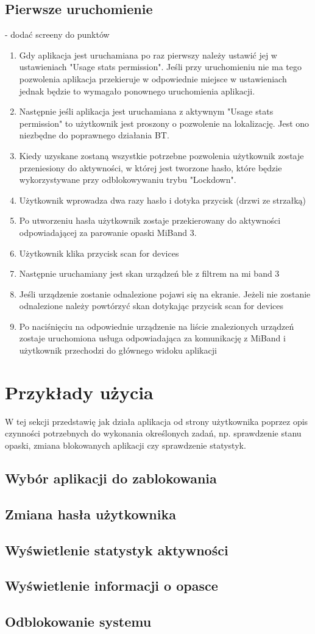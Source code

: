 \subsection{Pierwsze uruchomienie}
- dodać screeny do punktów
\begin{enumerate}
    \item Gdy aplikacja jest uruchamiana po raz pierwszy należy ustawić jej w ustawieniach "Usage stats permission". Jeśli przy uruchomieniu nie ma tego pozwolenia aplikacja przekieruje w odpowiednie miejsce w ustawieniach jednak będzie to wymagało ponownego uruchomienia aplikacji.
    \item Następnie jeśli aplikacja jest uruchamiana z aktywnym "Usage stats permission" to użytkownik jest proszony o pozwolenie na lokalizację. Jest ono niezbędne do poprawnego działania BT.
    \item Kiedy uzyskane zostaną wszystkie potrzebne pozwolenia użytkownik zostaje przeniesiony do aktywności, w której jest tworzone hasło, które będzie wykorzystywane przy odblokowywaniu trybu "Lockdown".
    \item  Użytkownik wprowadza dwa razy hasło i dotyka przycisk (drzwi ze strzałką)
    \item Po utworzeniu hasła użytkownik zostaje przekierowany do aktywności odpowiadającej za parowanie opaski MiBand 3. 
    \item Użytkownik klika przycisk scan for devices
    \item Następnie uruchamiany jest skan urządzeń ble z filtrem na mi band 3
    \item Jeśli urządzenie zostanie odnalezione pojawi się na ekranie. Jeżeli nie zostanie odnalezione należy powtórzyć skan dotykając przycisk scan for devices
    \item Po naciśnięciu na odpowiednie urządzenie na liście znalezionych urządzeń zostaje uruchomiona usługa odpowiadająca za komunikację z MiBand i użytkownik przechodzi do głównego widoku aplikacji
\end{enumerate}

\section{Przykłady użycia}
W tej sekcji przedstawię jak działa aplikacja od strony użytkownika poprzez opis czynności potrzebnych do wykonania określonych zadań, np. sprawdzenie stanu opaski, zmiana blokowanych aplikacji czy sprawdzenie statystyk.
\subsection{Wybór aplikacji do zablokowania}
\subsection{Zmiana hasła użytkownika}
\subsection{Wyświetlenie statystyk aktywności}
\subsection{Wyświetlenie informacji o opasce}
\subsection{Odblokowanie systemu}